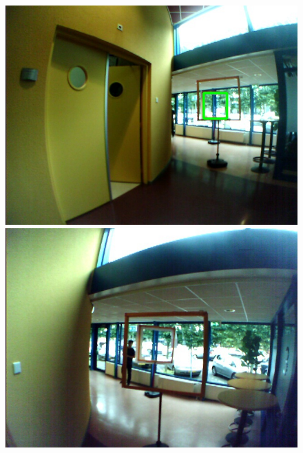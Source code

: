 \begin{figure}[hbtp]
\begin{minipage}{0.24\textwidth}
\end{minipage}
\begin{minipage}{0.24\textwidth}
	\includegraphics[width=\textwidth]{fig/examples/hallway_nice2.jpg}
\end{minipage}
\begin{minipage}{0.24\textwidth}
	\includegraphics[width=\textwidth]{fig/examples/hallway_notnice1.jpg}
\end{minipage}
\begin{minipage}{0.24\textwidth}

\end{minipage}
\end{figure}

